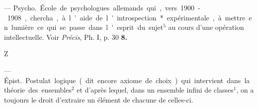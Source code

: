 \begin{itemize}[leftmargin=1cm, label=, itemsep=1pt]
 — \si{Psycho.}
École de psychologues allemands
qui, vers 1900-1908, chercha, à
l’aide de l'introspection* expérimentale, à mettre en lumière ce qui
se passe dans l'esprit du sujet$^5$ au
cours d’une opération intellectuelle.
Voir {\it Précis}, Ph. I, p. 30 {\bf 8.}

\begin{center}
Z
\end{center}

 — \si{Épist.} Postulat logique (dit encore axiome de
choix) qui intervient dans la théorie
des ensembles$^2$ et d’après lequel,
dans un ensemble infini de classes$^1$,
on a toujours le droit d'extraire
un élément de chacune de celles-ci.

	\end{itemize}
